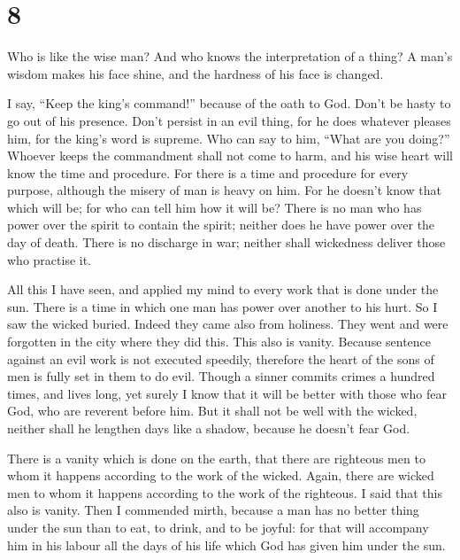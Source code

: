 \hypertarget{section-7}{%
\section{8}\label{section-7}}

 Who is like the wise man? And who knows the
interpretation of a thing? A man's wisdom makes his face shine, and the
hardness of his face is changed.

 I say, ``Keep the king's command!'' because of the oath
to God.  Don't be hasty to go out of his presence. Don't
persist in an evil thing, for he does whatever pleases him,
 for the king's word is supreme. Who can say to him,
``What are you doing?''  Whoever keeps the commandment
shall not come to harm, and his wise heart will know the time and
procedure.  For there is a time and procedure for every
purpose, although the misery of man is heavy on him.  For
he doesn't know that which will be; for who can tell him how it will be?
 There is no man who has power over the spirit to contain
the spirit; neither does he have power over the day of death. There is
no discharge in war; neither shall wickedness deliver those who practise
it.

 All this I have seen, and applied my mind to every work
that is done under the sun. There is a time in which one man has power
over another to his hurt.  So I saw the wicked buried.
Indeed they came also from holiness. They went and were forgotten in the
city where they did this. This also is vanity.  Because
sentence against an evil work is not executed speedily, therefore the
heart of the sons of men is fully set in them to do evil.
 Though a sinner commits crimes a hundred times, and
lives long, yet surely I know that it will be better with those who fear
God, who are reverent before him.  But it shall not be
well with the wicked, neither shall he lengthen days like a shadow,
because he doesn't fear God.

 There is a vanity which is done on the earth, that there
are righteous men to whom it happens according to the work of the
wicked. Again, there are wicked men to whom it happens according to the
work of the righteous. I said that this also is vanity. 
Then I commended mirth, because a man has no better thing under the sun
than to eat, to drink, and to be joyful: for that will accompany him in
his labour all the days of his life which God has given him under the
sun.

